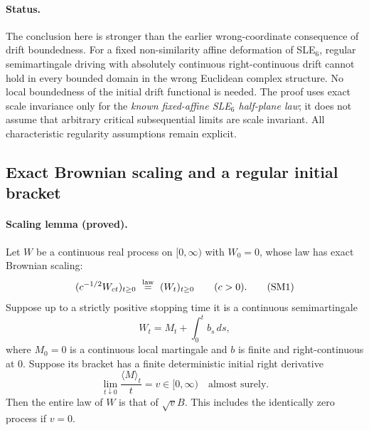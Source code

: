 \documentclass[11pt]{article}
\theoremstyle{definition}\newtheorem{definition}[theorem]{Definition}
\theoremstyle{remark}\newtheorem{remark}[theorem]{Remark}
\begin{document}
\paragraph{Status.}
The conclusion here is stronger than the earlier wrong-coordinate consequence
of drift boundedness.  For a fixed non-similarity affine deformation of SLE$_6$,
regular semimartingale driving with absolutely continuous right-continuous
drift cannot hold in every bounded domain in the wrong Euclidean complex
structure.  No local boundedness of the initial drift functional is needed.
The proof uses exact scale invariance only for the \emph{known fixed-affine
SLE$_6$ half-plane law}; it does not assume that arbitrary critical
subsequential limits are scale invariant.  All characteristic regularity
assumptions remain explicit.

\subsection{Exact Brownian scaling and a regular initial bracket}

\paragraph{Scaling lemma (proved).}
Let $W$ be a continuous real process on $[0,\infty)$ with $W_0=0$, whose law
has exact Brownian scaling:
\[
 (c^{-1/2}W_{ct})_{t\geq0}\ \stackrel{\rm law}{=}\ (W_t)_{t\geq0}
 \qquad(c>0).
 \tag{SM1}
\]
Suppose up to a strictly positive stopping time it is a continuous
semimartingale
\[
 W_t=M_t+\int_0^t b_s\,ds,
 \tag{SM2}
\]
where $M_0=0$ is a continuous local martingale and $b$ is finite and
right-continuous at $0$.  Suppose its bracket has a finite deterministic
initial right derivative
\[
 \lim_{t\downarrow0}\frac{\langle M\rangle_t}{t}=v\in[0,\infty)
 \quad\text{almost surely}.
 \tag{SM3}
\]
Then the entire law of $W$ is that of $\sqrt v B$.  This includes the
identically zero process if $v=0$.
\end{document}

